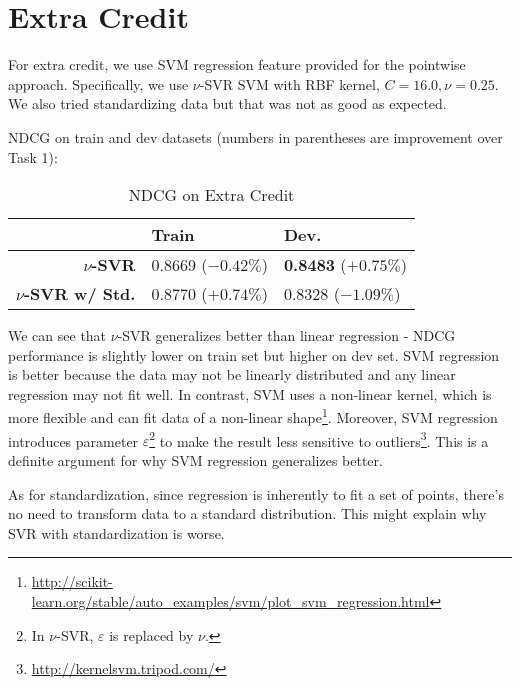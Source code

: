 \documentclass{article}
\begin{document}
\section{Extra Credit}

For extra credit, we use SVM regression feature provided for the pointwise approach.
Specifically, we use $\nu$-SVR SVM with RBF kernel, $C=16.0,\nu=0.25$. We also tried standardizing data but that was not as good as expected.

NDCG on train and dev datasets (numbers in parentheses are improvement over Task 1):

\begin{table}[!htb]
    \centering
    \begin{tabular}{| r | l | l |}
        \hline
        & \textbf{Train} & \textbf {Dev.} \\
        \hline
        \textbf{$\nu$-SVR} & 0.8669 ($-0.42\%$) & \textbf{0.8483} ($+0.75\%$) \\
        \hline
        \textbf{$\nu$-SVR w/ Std.} & 0.8770 ($+0.74\%$) & 0.8328 ($-1.09\%$) \\
        \hline
    \end{tabular}
    \caption{NDCG on Extra Credit}
\end{table}

We can see that $\nu$-SVR generalizes better than linear regression - NDCG performance is slightly lower on train set but higher on dev set. SVM regression is better because the data may not be linearly distributed and any linear regression may not fit well. In contrast, SVM uses a non-linear kernel, which is more flexible and can fit data of a non-linear shape\footnote{\url{http://scikit-learn.org/stable/auto_examples/svm/plot_svm_regression.html}}. Moreover, SVM regression introduces parameter $\varepsilon$\footnote{In $\nu$-SVR, $\varepsilon$ is replaced by $\nu$.} to make the result less sensitive to outliers\footnote{\url{http://kernelsvm.tripod.com/}}. This is a definite argument for why SVM regression generalizes better.

As for standardization, since regression is inherently to fit a set of points, there's no need to transform data to a standard distribution. This might explain why SVR with standardization is worse.
\end{document}
